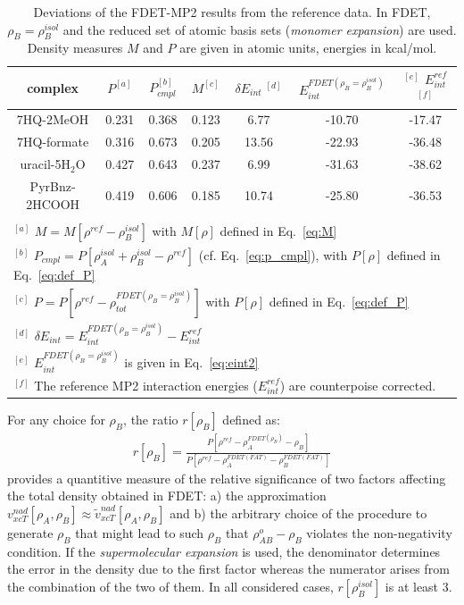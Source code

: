 \documentclass[amsmath,amssymb,preprint,aip,jcp]{revtex4-1}
\begin{document}
\begin{table}
{
\begin{center}
\begin{tabular}{|c|c|c|c|c|c|c|}
\hline
 complex & $P^{[a]}$ & $P_{cmpl}^{[b]}$ & $M^{[c]}$ & $\delta E_{int}\;^{[d]}$ & $E^{FDET(\rho_B=\rho_B^{isol})}_{int}$ & $^{[e]}$ $E_{int}^{ref}$ $^{[f]}$ \\ \hline
7HQ-2MeOH & 0.231 & 0.368 & 0.123 & 6.77 & -10.70 & -17.47 \\ \hline
7HQ-formate & 0.316 & 0.673 & 0.205 & 13.56 & -22.93 & -36.48 \\ \hline
uracil-5H$_2$O & 0.427 & 0.643 & 0.237 & 6.99 & -31.63 & -38.62 \\ \hline
PyrBnz-2HCOOH & 0.419 & 0.606 & 0.185 & 10.74 & -25.80 & -36.53 \\ \hline
\multicolumn{7}{c}{ } \\
\multicolumn{7}{l}{$^{[a]}$ $M=M[\rho^{ref} - \rho^{isol}_{B}]$ with $M[\rho]$ defined in Eq.~\ref{eq:M}}\\
\multicolumn{7}{l}{$^{[b]}$ $P_{cmpl}=P[\rho_A^{isol}+\rho_B^{isol} - \rho^{ref}]$ (cf. Eq.~\ref{eq:p_cmpl}), with $P[\rho]$ defined in Eq.~\ref{eq:def_P}}\\
\multicolumn{7}{l}{$^{[c]}$ $P=P[\rho^{ref} - \rho_{tot}^{FDET(\rho_B=\rho_B^{isol})}]$ with $P[\rho]$ defined in Eq.~\ref{eq:def_P}}\\
\multicolumn{7}{l}{$^{[d]}$ $\delta E_{int}=E^{FDET(\rho_B=\rho_B^{isol})}_{int}-E_{int}^{ref}$} \\
\multicolumn{7}{l}{$^{[e]}$ $E^{FDET(\rho_B=\rho_B^{isol})}_{int}$ is given in Eq.~\ref{eq:eint2}}\\
\multicolumn{7}{l}{$^{[f]}$ The reference MP2 interaction energies ($E_{int}^{ref}$) are counterpoise corrected.}
\end{tabular}
\end{center}
}%
\caption{Deviations of the FDET-MP2 results from the reference data. In FDET, $\rho_B=\rho_B^{isol}$ and the reduced set of atomic basis sets ({\it monomer expansion}) are used. 
Density measures $M$ and $P$ are given in atomic units, energies in kcal/mol.
}
\label{table:ME_isol}
\end{table}

For any choice for $\rho_B$,
the ratio $r[\rho_B]$ defined as:
\begin{eqnarray}
r[\rho_B]=\frac{P[\rho^{ref} - \rho_{A}^{FDET(\rho_{B})}-\rho_{B}]}{P[\rho^{ref} - \rho_{A}^{FDET(FAT)}-\rho_{B}^{FDET(FAT)}]}
\end{eqnarray}
provides a quantitive measure of the relative significance of two factors affecting the total density obtained in FDET:
a) the approximation $v_{xcT}^{nad}[\rho_A,\rho_B]\approx \tilde{v}_{xcT}^{nad}[\rho_A,\rho_B]$ and b) the arbitrary choice of the procedure to generate $\rho_B$ that might lead to such $\rho_B$ that 
$\rho_{AB}^o-\rho_B$ violates the non-negativity condition.
If the {\it supermolecular expansion} is used, the denominator determines the error in the density due to the first factor whereas the numerator arises from the combination of the two of them.
In all considered cases, $r[\rho_B^{isol}]$ is at least 3.
\end{document}
